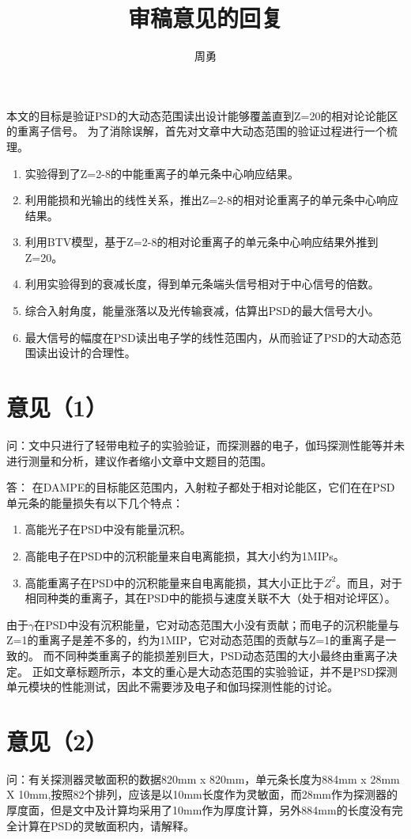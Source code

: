 \documentclass[UTF8]{ctexart}
\title{审稿意见的回复}
\author{周勇}
\begin{document}
\maketitle

本文的目标是验证PSD的大动态范围读出设计能够覆盖直到Z=20的相对论论能区的重离子信号。
为了消除误解，首先对文章中大动态范围的验证过程进行一个梳理。
\begin{enumerate}
  \item 实验得到了Z=2-8的中能重离子的单元条中心响应结果。
  \item 利用能损和光输出的线性关系，推出Z=2-8的相对论重离子的单元条中心响应结果。
  \item 利用BTV模型，基于Z=2-8的相对论重离子的单元条中心响应结果外推到Z=20。
  \item 利用实验得到的衰减长度，得到单元条端头信号相对于中心信号的倍数。
  \item 综合入射角度，能量涨落以及光传输衰减，估算出PSD的最大信号大小。
  \item 最大信号的幅度在PSD读出电子学的线性范围内，从而验证了PSD的大动态范围读出设计的合理性。
\end{enumerate}

\section{意见（1）}
问：文中只进行了轻带电粒子的实验验证，而探测器的电子，伽玛探测性能等并未进行测量和分析，建议作者缩小文章中文题目的范围。

答：
在DAMPE的目标能区范围内，入射粒子都处于相对论能区，它们在在PSD单元条的能量损失有以下几个特点：
\begin{enumerate}
 \item 高能光子在PSD中没有能量沉积。
 \item 高能电子在PSD中的沉积能量来自电离能损，其大小约为1MIPs。
 \item 高能重离子在PSD中的沉积能量来自电离能损，其大小正比于$Z^2$。而且，对于相同种类的重离子，其在PSD中的能损与速度关联不大（处于相对论坪区）。
\end{enumerate}
由于$\gamma$在PSD中没有沉积能量，它对动态范围大小没有贡献；而电子的沉积能量与Z=1的重离子是差不多的，约为1MIP，它对动态范围的贡献与Z=1的重离子是一致的。
而不同种类重离子的能损差别巨大，PSD动态范围的大小最终由重离子决定。
正如文章标题所示，本文的重心是大动态范围的实验验证，并不是PSD探测单元模块的性能测试，因此不需要涉及电子和伽玛探测性能的讨论。

\section{意见（2）}
问：有关探测器灵敏面积的数据820mm x 820mm，单元条长度为884mm x 28mm X 10mm,按照82个排列，应该是以10mm长度作为灵敏面，而28mm作为探测器的厚度面，但是文中及计算均采用了10mm作为厚度计算，另外884mm的长度没有完全计算在PSD的灵敏面积内，请解释。
\end{document}
